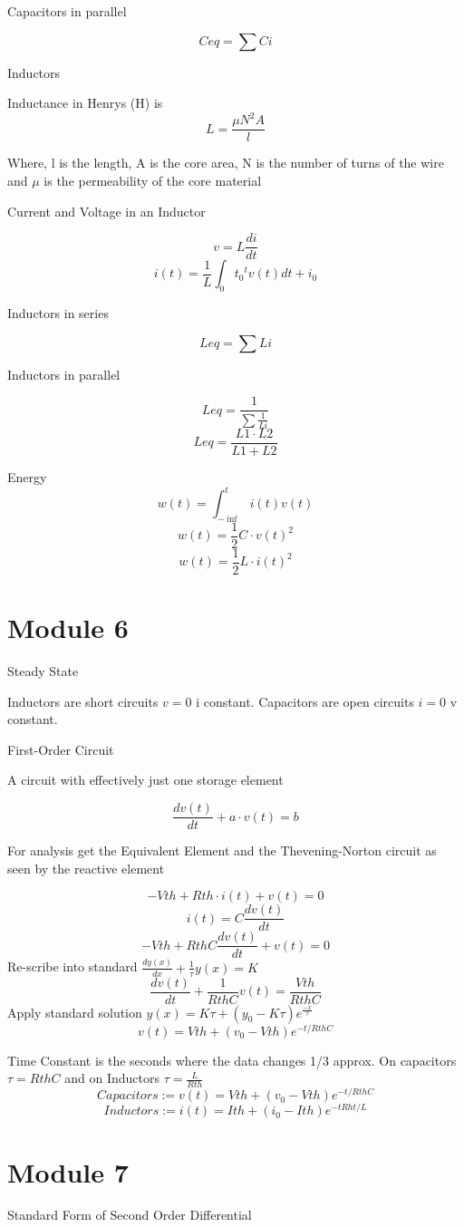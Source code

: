 \documentclass[]{article}
\begin{document}
Capacitors in parallel

$$Ceq=\sum Ci$$

Inductors

Inductance in Henrys (H) is 
$$L=\frac{\mu N^2 A}{l}$$

Where, l is the length, A is the core area, N is the number of turns of the wire and $\mu$ is the permeability of the core
material

Current and Voltage in an Inductor

$$v=L\frac{di}{dt}$$
$$i(t)=\frac{1}{L}\int_0{t_0}^{t}{v(t)dt}+i_0$$	

Inductors in series

$$Leq=\sum Li$$

Inductors in parallel

$$Leq=\frac{1}{\sum\frac{1}{Li}}$$
$$Leq=\frac{L1\cdot L2}{L1+L2}$$

Energy
$$w(t)=\int_{-\inf}^{t}i(t)v(t)$$
$$w(t)=\frac{1}{2}C\cdot v(t)^2$$
$$w(t)=\frac{1}{2}L\cdot i(t)^2$$

\section{Module 6}
Steady State

Inductors are short circuits $v=0$ i constant. Capacitors are open circuits $i=0$ v constant.

First-Order Circuit

A circuit with effectively just one
storage element

$$\frac{dv(t)}{dt}+a\cdot v(t) =b$$

For analysis get the Equivalent Element and the Thevening-Norton circuit as seen by the reactive element

$$-Vth + Rth \cdot i(t) + v(t) =0$$
$$i(t)=C\frac{dv(t)}{dt}$$
$$-Vth +RthC\frac{dv(t)}{dt}+v(t)=0$$
Re-scribe into standard  $\frac{dy(x)}{dx} +\frac{1}{\tau}y(x)=K$
$$\frac{dv(t)}{dt}+\frac{1}{RthC}v(t)=\frac{Vth}{RthC}$$
Apply standard solution $y(x)=K\tau +\left(y_0 -K\tau\right)e^{\frac{-x}{\tau}}$
$$v(t)=Vth+\left(v_0-Vth\right)e^{-t/RthC}$$

Time Constant is the seconds where the data changes 1/3 approx. On capacitors $\tau=RthC$ and on Inductors $\tau=\frac{L}{Rth}$
$$Capacitors:=v(t)=Vth+\left(v_0-Vth\right)e^{-t/RthC}$$
$$Inductors:=i(t)=Ith+\left(i_0-Ith\right)e^{-tRht/L}$$

\section{Module 7}
Standard Form of Second Order Differential
\end{document}
